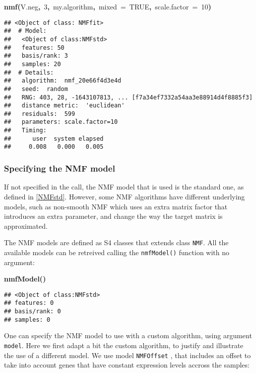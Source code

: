 \documentclass[a4paper]{article}\usepackage{graphicx, color}
\makeatletter
\newcommand{\hlnumber}[1]{\textcolor[rgb]{0,0,0}{#1}}%
\newcommand{\hlfunctioncall}[1]{\textcolor[rgb]{0.501960784313725,0,0.329411764705882}{\textbf{#1}}}%
\newcommand{\hlkeyword}[1]{\textcolor[rgb]{0,0,0}{\textbf{#1}}}%
\newcommand{\hlargument}[1]{\textcolor[rgb]{0.690196078431373,0.250980392156863,0.0196078431372549}{#1}}%
\newcommand{\hlsymbol}[1]{\textcolor[rgb]{0,0,0}{#1}}%
\newcommand{\hlstd}[1]{\textcolor[rgb]{0,0,0}{#1}}%
\newenvironment{kframe}{%
 \def\FrameCommand##1{\hskip\@totalleftmargin \hskip-\fboxsep
 \colorbox{shadecolor}{##1}\hskip-\fboxsep
     \hskip-\linewidth \hskip-\@totalleftmargin \hskip\columnwidth}%
 \MakeFramed {\advance\hsize-\width
   \@totalleftmargin\z@ \linewidth\hsize
   \@setminipage}}%
 {\par\unskip\endMakeFramed}
\newenvironment{knitrout}{}{} %
\let\code=\texttt
\makeatother
\begin{document}
\begin{knitrout}
\begin{kframe}
\begin{flushleft}
\hlstd{}\hlfunctioncall{nmf}\hlkeyword{(}\hlsymbol{V.neg}\hlkeyword{,}{\ }\hlnumber{3}\hlkeyword{,}{\ }\hlsymbol{my.algorithm}\hlkeyword{,}{\ }\hlargument{mixed}{\ }\hlargument{=}{\ }\hlnumber{TRUE}\hlkeyword{,}{\ }\hlargument{scale.factor}{\ }\hlargument{=}{\ }\hlnumber{10}\hlkeyword{)}\mbox{}
\normalfont
\end{flushleft}
\begin{verbatim}
## <Object of class: NMFfit>
##  # Model:
##   <Object of class:NMFstd>
##   features: 50 
##   basis/rank: 3 
##   samples: 20 
##  # Details:
##   algorithm:  nmf_20e66f4d3e4d 
##   seed:  random 
##   RNG: 403, 28, -1643107813, ... [f7a34ef7332a54aa3e88914d4f8885f3]
##   distance metric:  'euclidean' 
##   residuals:  599 
##   parameters: scale.factor=10 
##   Timing:
##      user  system elapsed 
##     0.008   0.000   0.005 
\end{verbatim}
\end{kframe}
\end{knitrout}


\subsubsection{Specifying the NMF model}
If not specified in the call, the NMF model that is used is the standard one, as defined in \cref{NMFstd}. 
However, some NMF algorithms have different underlying models, such as non-smooth NMF \cite{Pascual-Montano2006} which uses an extra matrix factor that introduces an extra parameter, and change the way the target matrix is approximated.

The NMF models are defined as S4 classes that extends class \code{NMF}. All the available models can be retreived calling the \code{nmfModel()} function with no 
argument:

\begin{knitrout}
\color{fgcolor}\begin{kframe}
\begin{flushleft}
\ttfamily\noindent
\hlfunctioncall{nmfModel}\hlkeyword{(}\hlkeyword{)}\mbox{}
\normalfont
\end{flushleft}
\begin{verbatim}
## <Object of class:NMFstd>
## features: 0 
## basis/rank: 0 
## samples: 0 
\end{verbatim}
\end{kframe}
\end{knitrout}

 
One can specify the NMF model to use with a custom algorithm, using argument \code{model}. Here we first adapt a bit the custom algorithm, to justify and illustrate the use of a different model.
We use model \code{NMFOffset} \cite{Badea2008}, that includes an offset to take into account genes that have constant expression levels accross the samples:
\end{document}

